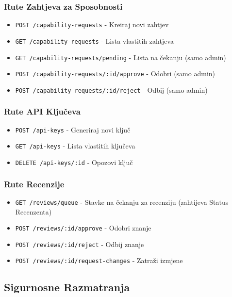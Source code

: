 \documentclass[12pt,a4paper]{article}
\begin{document}
\subsubsection{Rute Zahtjeva za Sposobnosti}
\begin{itemize}
    \item \texttt{POST /capability-requests} - Kreiraj novi zahtjev
    \item \texttt{GET /capability-requests} - Lista vlastitih zahtjeva
    \item \texttt{GET /capability-requests/pending} - Lista na čekanju (samo admin)
    \item \texttt{POST /capability-requests/:id/approve} - Odobri (samo admin)
    \item \texttt{POST /capability-requests/:id/reject} - Odbij (samo admin)
\end{itemize}

\subsubsection{Rute API Ključeva}
\begin{itemize}
    \item \texttt{POST /api-keys} - Generiraj novi ključ
    \item \texttt{GET /api-keys} - Lista vlastitih ključeva
    \item \texttt{DELETE /api-keys/:id} - Opozovi ključ
\end{itemize}

\subsubsection{Rute Recenzije}
\begin{itemize}
    \item \texttt{GET /reviews/queue} - Stavke na čekanju za recenziju (zahtijeva Status Recenzenta)
    \item \texttt{POST /reviews/:id/approve} - Odobri znanje
    \item \texttt{POST /reviews/:id/reject} - Odbij znanje
    \item \texttt{POST /reviews/:id/request-changes} - Zatraži izmjene
\end{itemize}

\subsection{Sigurnosne Razmatranja}
\end{document}
